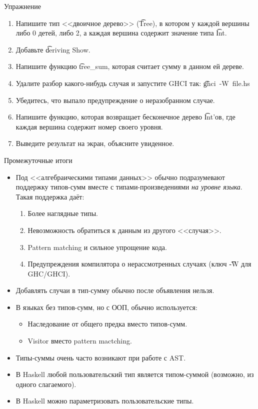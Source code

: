 \begin{frame}[fragile]{Упражнение}
	\begin{enumerate}
		\item Напишите тип <<двоичное дерево>> (\t{Tree}), в котором у каждой вершины либо 0 детей, либо 2, а каждая вершина содержит значение типа \t{Int}.
		\item Добавьте \t{deriving Show}.
		\item Напишите функцию \t{tree\_sum}, которая считает сумму в данном ей дереве.
		\item Удалите разбор какого-нибудь случая и запустите GHCI так: \t{ghci~-W~file.hs}
		\item Убедитесь, что выпало предупреждение о неразобранном случае.
		\item Напишите функцию, которая возвращает бесконечное дерево \t{Int}'ов, где каждая вершина содержит номер своего уровня.
		\item Выведите результат на экран, объясните увиденное.
	\end{enumerate}
\end{frame}

\begin{frame}{Промежуточные итоги}
	\begin{itemize}
		\item
			Под <<алгебраическими типами данных>> обычно подразумевают поддержку типов-сумм вместе с типами-произведениями \textit{на уровне языка}.
			Такая поддержка даёт:
			\begin{enumerate}
				\item Более наглядные типы.
				\item Невозможность обратиться к данным из другого <<случая>>.
				\item Pattern matching и сильное упрощение кода.
				\item Предупреждения компилятора о нерассмотренных случаях (ключ \t{-W} для GHC/GHCI).
			\end{enumerate}
		\item Добавлять случаи в тип-сумму обычно после объявления нельзя.
		\item В языках без типов-сумм, но с ООП, обычно используется:
			\begin{itemize}
				\item Наследование от общего предка вместо типов-сумм.
				\item Visitor вместо pattern mactching.
			\end{itemize}
		\item Типы-суммы очень часто возникают при работе с AST.
		\item В Haskell любой пользовательский тип является типом-суммой (возможно, из одного слагаемого).
		\item В Haskell можно параметризовать пользовательские типы.
	\end{itemize}
\end{frame}
